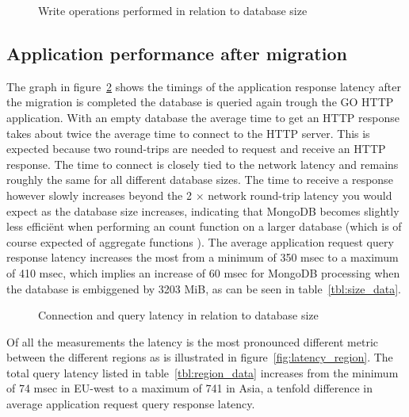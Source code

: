 \documentclass{article}
\begin{document}
\begin{center}
\begin{figure}[!ht]
    \caption{Write operations performed in relation to database size}
    \label{fig:write_operations}
\end{figure}
\end{center}


\subsection{Application performance after migration}

The graph in figure~\ref{fig:latency_size} shows the timings of the application response latency after the migration is completed the database is queried again trough the GO HTTP application. With an empty database the average time to get an HTTP response takes about twice the average time to connect to the HTTP server. This is expected because two round-trips are needed to request and receive an HTTP response. The time to connect is closely tied to the network latency and remains roughly the same for all different database sizes. The time to receive a response however slowly increases beyond the 2 × network round-trip latency you would expect as the database size increases, indicating that MongoDB becomes slightly less efficiënt when performing an count function on a larger database (which is of course expected of aggregate functions \cite{mongodb-aggregation}). The average application request query response latency increases the most from a minimum of 350 msec to a maximum of 410 msec, which implies an increase of 60 msec for MongoDB processing when the database is embiggened by 3203 MiB, as can be seen in table~\ref{tbl:size_data}.

\begin{center}
\begin{figure}[!ht]
    \caption{Connection and query latency in relation to database size}
    \label{fig:latency_size}
\end{figure}
\end{center}

Of all the measurements the latency is the most pronounced different metric between the different regions as is illustrated in figure~\ref{fig:latency_region}. The total query latency listed in table~\ref{tbl:region_data} increases from the minimum of 74 msec in EU-west to a maximum of 741 in Asia, a tenfold difference in average application request query response latency.
\end{document}
